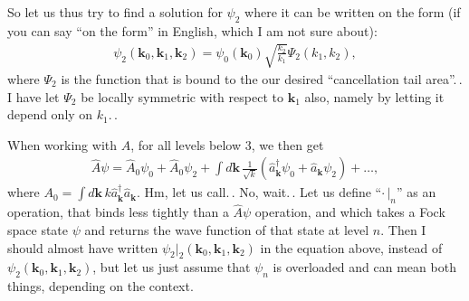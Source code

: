 \documentclass{report}
\begin{document}
So let us thus try to find a solution for $\psi_2$ where it can be written on the form (if you can say ``on the form'' in English, which I am not sure about):
\begin{align}
	\psi_2(\mathbf{k}_0, \mathbf{k}_1, \mathbf{k}_2) = 
		\psi_0(\mathbf{k}_0)
		\sqrt{\frac{k_2}{k_1}}
		\Psi_2(k_1, k_2)
		,
\end{align}
where $\Psi_2$ is the function that is bound to the our desired ``cancellation tail area''.\,. I have let $\Psi_2$ be locally symmetric with respect to $\mathbf{k}_1$ also, namely by letting it depend only on $k_1$.\,. 

When working with $A$, for all levels below 3, we then get
\begin{align}
	\hat A\psi = 
		\hat A_0\psi_0 + 
		\hat A_0 \psi_2 +
		\int d\mathbf{k}\, 
			\frac{1}{\sqrt{k}} ( \hat a_\mathbf{k}^\dagger \psi_0 +  \hat a_\mathbf{k} \psi_2)
		+ \ldots,
\end{align}
where $A_0 = \int d\mathbf{k}\, k \hat a_\mathbf{k}^\dagger \hat a_\mathbf{k}$.
Hm, let us call.\,. No, wait.\,. Let us define ``$\cdot\, |_n$'' as an operation, that binds less tightly than a $\hat A \psi$ operation, and which takes a Fock space state $\psi$ and returns the wave function of that state at level $n$. Then I should almost have written $\psi_2 |_ 2 (\mathbf{k}_0, \mathbf{k}_1, \mathbf{k}_2)$ in the equation above, instead of $\psi_2(\mathbf{k}_0, \mathbf{k}_1, \mathbf{k}_2)$, but let us just assume that $\psi_n$ is overloaded and can mean both things, depending on the context. 
\end{document}
